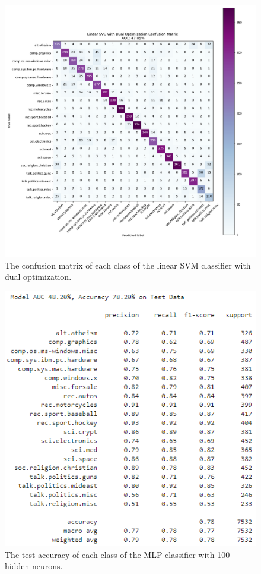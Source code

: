 \documentclass[twocolumn]{extarticle}
\begin{document}
\begin{appendices}
\begin{figure}[H]
\centering
\includegraphics[width=0.9\linewidth]{"charts/Linear SVC with Dual Optimization"}
\caption{The confusion matrix of each class of the linear SVM classifier with dual optimization.}
\label{chart:svm-dual-conf}
\end{figure}

\begin{figure}[H]
\centering
\includegraphics[width=0.9\linewidth]{charts/mlp-100-acc}
\caption{The test accuracy of each class of the MLP classifier with 100 hidden neurons.}
\label{chart:mlp-100-acc}
\end{figure}


\end{appendices}
\end{document}
